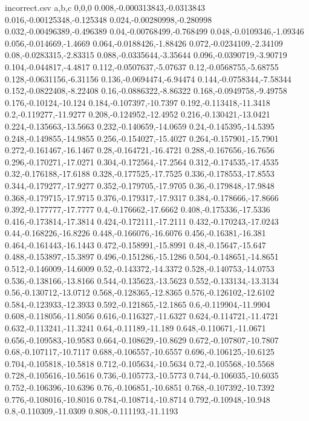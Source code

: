 \begin{filecontents*}{incorrect.csv}
a,b,c
0,0,0
0.008,-0.000313843,-0.0313843
0.016,-0.00125348,-0.125348
0.024,-0.00280998,-0.280998
0.032,-0.00496389,-0.496389
0.04,-0.00768499,-0.768499
0.048,-0.0109346,-1.09346
0.056,-0.014669,-1.4669
0.064,-0.0188426,-1.88426
0.072,-0.0234109,-2.34109
0.08,-0.0283315,-2.83315
0.088,-0.0335644,-3.35644
0.096,-0.0390719,-3.90719
0.104,-0.044817,-4.4817
0.112,-0.0507637,-5.07637
0.12,-0.0568755,-5.68755
0.128,-0.0631156,-6.31156
0.136,-0.0694474,-6.94474
0.144,-0.0758344,-7.58344
0.152,-0.0822408,-8.22408
0.16,-0.0886322,-8.86322
0.168,-0.0949758,-9.49758
0.176,-0.10124,-10.124
0.184,-0.107397,-10.7397
0.192,-0.113418,-11.3418
0.2,-0.119277,-11.9277
0.208,-0.124952,-12.4952
0.216,-0.130421,-13.0421
0.224,-0.135663,-13.5663
0.232,-0.140659,-14.0659
0.24,-0.145395,-14.5395
0.248,-0.149855,-14.9855
0.256,-0.154027,-15.4027
0.264,-0.157901,-15.7901
0.272,-0.161467,-16.1467
0.28,-0.164721,-16.4721
0.288,-0.167656,-16.7656
0.296,-0.170271,-17.0271
0.304,-0.172564,-17.2564
0.312,-0.174535,-17.4535
0.32,-0.176188,-17.6188
0.328,-0.177525,-17.7525
0.336,-0.178553,-17.8553
0.344,-0.179277,-17.9277
0.352,-0.179705,-17.9705
0.36,-0.179848,-17.9848
0.368,-0.179715,-17.9715
0.376,-0.179317,-17.9317
0.384,-0.178666,-17.8666
0.392,-0.177777,-17.7777
0.4,-0.176662,-17.6662
0.408,-0.175336,-17.5336
0.416,-0.173814,-17.3814
0.424,-0.172111,-17.2111
0.432,-0.170243,-17.0243
0.44,-0.168226,-16.8226
0.448,-0.166076,-16.6076
0.456,-0.16381,-16.381
0.464,-0.161443,-16.1443
0.472,-0.158991,-15.8991
0.48,-0.15647,-15.647
0.488,-0.153897,-15.3897
0.496,-0.151286,-15.1286
0.504,-0.148651,-14.8651
0.512,-0.146009,-14.6009
0.52,-0.143372,-14.3372
0.528,-0.140753,-14.0753
0.536,-0.138166,-13.8166
0.544,-0.135623,-13.5623
0.552,-0.133134,-13.3134
0.56,-0.130712,-13.0712
0.568,-0.128365,-12.8365
0.576,-0.126102,-12.6102
0.584,-0.123933,-12.3933
0.592,-0.121865,-12.1865
0.6,-0.119904,-11.9904
0.608,-0.118056,-11.8056
0.616,-0.116327,-11.6327
0.624,-0.114721,-11.4721
0.632,-0.113241,-11.3241
0.64,-0.11189,-11.189
0.648,-0.110671,-11.0671
0.656,-0.109583,-10.9583
0.664,-0.108629,-10.8629
0.672,-0.107807,-10.7807
0.68,-0.107117,-10.7117
0.688,-0.106557,-10.6557
0.696,-0.106125,-10.6125
0.704,-0.105818,-10.5818
0.712,-0.105634,-10.5634
0.72,-0.105568,-10.5568
0.728,-0.105616,-10.5616
0.736,-0.105773,-10.5773
0.744,-0.106035,-10.6035
0.752,-0.106396,-10.6396
0.76,-0.106851,-10.6851
0.768,-0.107392,-10.7392
0.776,-0.108016,-10.8016
0.784,-0.108714,-10.8714
0.792,-0.10948,-10.948
0.8,-0.110309,-11.0309
0.808,-0.111193,-11.1193

\end{filecontents*}
